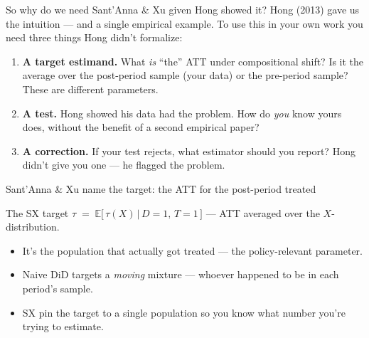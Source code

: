 \documentclass[aspectratio=169,11pt]{beamer}
\begin{document}
\begin{frame}{So why do we need Sant'Anna \& Xu given Hong showed it?}
\vspace{0.4em}
Hong (2013) gave us the intuition --- and a single empirical example. To use this in your own work you need three things Hong didn't formalize:
\vspace{0.4em}
\begin{enumerate}\small
  \item \textbf{A target estimand.} What \textit{is} ``the'' ATT under compositional shift? Is it the average over the post-period sample (your data) or the pre-period sample? These are different parameters.
  \item \textbf{A test.} Hong showed his data had the problem. How do \textit{you} know yours does, without the benefit of a second empirical paper?
  \item \textbf{A correction.} If your test rejects, what estimator should you report? Hong didn't give you one --- he flagged the problem.
\end{enumerate}
\end{frame}

\begin{frame}[plain]
\end{frame}

\begin{frame}{Sant'Anna \& Xu name the target: the ATT for the post-period treated}
\vspace{0.3em}
\vspace{0.4em}
\begin{block}{The SX target}
\centering
\small $\tau \;=\; \mathbb{E}\big[\,\tau(X) \,\big|\, D{=}1,\, T{=}1\,\big]$ --- ATT averaged over the  $X$-distribution.
\end{block}
\vspace{0.2em}
\begin{itemize}\small
  \item {} \;It's the population that actually got treated --- the policy-relevant parameter.
  \item Naive DiD targets a \textit{moving} mixture --- whoever happened to be in each period's sample.
  \item SX pin the target to a single population so you know what number you're trying to estimate.
\end{itemize}
\end{frame}
\end{document}
